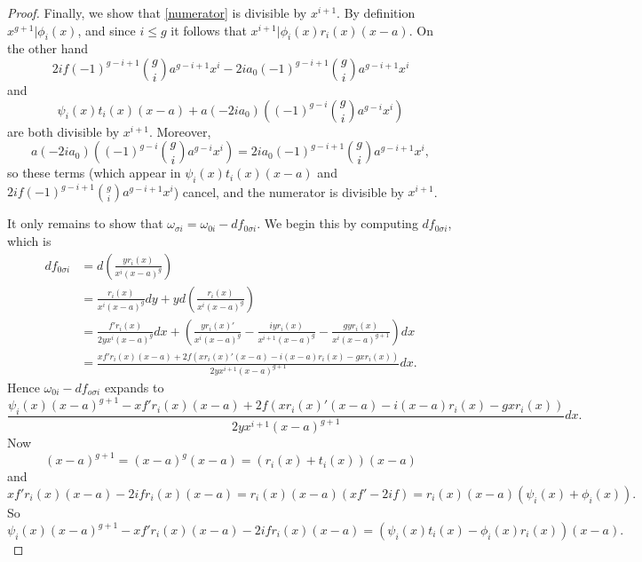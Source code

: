 \documentclass[draft, 11pt]{article} %
\theoremstyle{plain}
\theoremstyle{remark}
\begin{document}
\begin{proof}
Finally, we show that \eqref{numerator} is divisible by $x^{i+1}$.
By definition $x^{g+1} | \phi_i(x)$, and since $i \leq g$ it follows that $x^{i+1}|\phi_i(x)r_i(x)(x-a)$.
On the other hand
\[
2if(-1)^{g-i+1}\binom{g}{i}a^{g-i+1}x^i - 2ia_0(-1)^{g-i+1}\binom{g}{i}a^{g-i+1}x^i 
\]
and
\[
\psi_i(x)t_i(x)(x-a) + a(-2ia_0)\left( (-1)^{g-i}\binom{g}{i}a^{g-i}x^i \right)
\]
are both divisible by $x^{i+1}$.
Moreover, 
\[
a(-2ia_0)\left( (-1)^{g-i}\binom{g}{i}a^{g-i}x^i \right) = 2ia_0(-1)^{g-i+1}\binom{g}{i}a^{g-i+1}x^i,
\]
so these terms (which appear in $\psi_i(x)t_i(x)(x-a)$ and $2if(-1)^{g-i+1}\binom{g}{i}a^{g-i+1}x^i$) cancel, and the numerator is divisible by $x^{i+1}$.


It only remains to show that $\omega_{\sigma i} = \omega_{0 i} -df_{0 \sigma i}$.
We begin this by computing $df_{0 \sigma i}$, which is
\begin{align*}
df_{0 \sigma i} & = d \left( \frac{y r_i(x)}{x^i(x-a)^g} \right) \\
& = \frac{r_i(x)}{x^i(x-a)^g}dy + y d\left( \frac{r_i(x)}{x^i(x-a)^g} \right) \\
& = \frac{f'r_i(x)}{2yx^i(x-a)^g}dx + \left( \frac{yr_i(x)'}{x^i(x-a)^g} -\frac{iy r_i(x)}{x^{i+1}(x-a)^g} - \frac{gyr_i(x)}{x^i(x-a)^{g+1}}\right) dx \\
& = \frac{xf'r_i(x)(x-a) + 2f(xr_i(x)'(x-a) - i(x-a)r_i(x) - gxr_i(x))}{2yx^{i+1}(x-a)^{g+1}} dx.
\end{align*}
Hence $\omega_{0 i} - df_{o \sigma i}$ expands to
\[
\frac{\psi_i(x)(x-a)^{g+1} - xf'r_i(x)(x-a) + 2f(xr_i(x)'(x-a)-i(x-a)r_i(x)-gxr_i(x))}{2yx^{i+1}(x-a)^{g+1}}dx.
\]
Now
\[
(x-a)^{g+1} = (x-a)^g(x-a)  = (r_i(x) + t_i(x))(x-a)
\]
and
\[
xf'r_i(x)(x-a) - 2ifr_i(x)(x-a) = r_i(x)(x-a)(xf'-2if) = r_i(x)(x-a)(\psi_i(x) + \phi_i(x)).
\]
So
\[
\psi_i(x)(x-a)^{g+1} - xf'r_i(x)(x-a) - 2ifr_i(x)(x-a) = (\psi_i(x)t_i(x) - \phi_i(x) r_i(x))(x-a).
\]



\end{proof}
\end{document}

